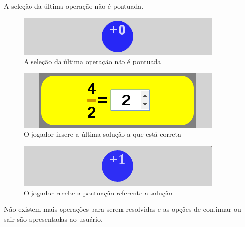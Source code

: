 A seleção da última operação não é pontuada.

\begin{figure}[H]
	\caption{\label{score_0_1}A seleção da última operação não é pontuada}
	\begin{center}
	    \includegraphics[scale=1]{score_0.png}
	\end{center}
\end{figure}

\begin{figure}[H]
	\caption{\label{xp_10}O jogador insere a última solução a que está correta}
	\begin{center}
	    \includegraphics[scale=1]{xp_4_10_rightans_3.png}
	\end{center}
\end{figure}

\begin{figure}[H]
	\caption{\label{score_1_3}O jogador recebe a pontuação referente a solução}
	\begin{center}
	    \includegraphics[scale=1]{score_1.png}
	\end{center}
\end{figure}

	Não existem mais operações para serem resolvidas e as opções de continuar ou sair são apresentadas ao usuário.
	
